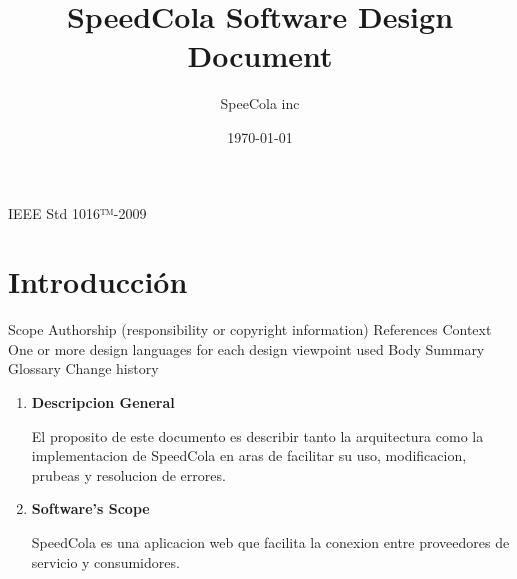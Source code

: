 \documentclass{article}
\title{SpeedCola Software Design Document}
\date{\today}%
\author{SpeeCola inc}%
\begin{document}
\maketitle
IEEE Std 1016™-2009
\newpage
{}

\section{Introducci\'on}
Scope
   Authorship (responsibility or copyright information)
   References
   Context
   One or more design languages for each design viewpoint used
   Body
   Summary
   Glossary
   Change history

  \begin{enumerate}
    \item  \textbf{Descripcion General}

  El proposito de este documento es describir tanto la arquitectura como la implementacion de 
  SpeedCola en aras de facilitar su uso, modificacion, prubeas y resolucion de errores.

  \item \textbf{Software's Scope}

  SpeedCola es una aplicacion web que facilita la conexion entre proveedores de servicio y consumidores.

  \end{enumerate}
\end{document}
